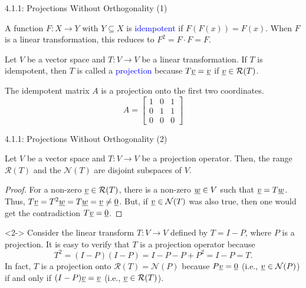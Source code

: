 \documentclass[10pt,letterpaper,english]{beamer}
\begin{document}
\begin{frame}{4.1.1: Projections Without Orthogonality (1)}

\begin{definition}
A function $F \colon X \rightarrow Y$ with $Y \subseteq X$ is \textcolor{blue}{idempotent} if $F(F(x))=F(x)$.  When $F$ is a linear transformation, this reduces to $F^2 = F \cdot F = F$.
\end{definition}

\begin{definition}
Let $V$ be a vector space and $T \colon V \rightarrow V$ be a linear transformation.
If $T$ is idempotent, then $T$ is called a \textcolor{blue}{projection} because $T\underline{v} = \underline{v}$ if $\underline{v} \in \mathcal{R}(T)$.
\end{definition}

\begin{example}
The idempotent matrix $A$ is a projection onto the first two coordinates. \vspace{-2mm}
\begin{equation*}
A = \begin{bmatrix}
1 & 0 & 1 \\
0 & 1 & 1 \\
0 & 0 & 0
\end{bmatrix}
\end{equation*}
\end{example}

\end{frame}

\begin{frame}{4.1.1: Projections Without Orthogonality (2)}

\begin{theorem}
Let $V$ be a vector space and $T \colon V \rightarrow V$ be a projection operator.
Then, the range $\mathcal{R}(T)$ and the $\mathcal{N}(T)$ are disjoint subspaces of $V$.
\end{theorem}

\begin{proof}
For a non-zero $\underline{v} \in \mathcal{R}(T)$, there is a non-zero $\underline{w} \in V$ such that $\underline{v} = T\underline{w}$.  Thus, $T\underline{v} = T^2  \underline{w} = T \underline{w} = \underline{v} \neq \underline{0}$.  But, if $\underline{v} \in \mathcal{N}(T)$ was also true, then one would get the contradiction $T\underline{v} = \underline{0}$.
\end{proof}

\begin{example}<2->
Consider the linear transform $T \colon V \rightarrow V$ defined by $T = I - P$, where $P$ is a projection.
It is easy to verify that $T$ is a projection operator because \vspace{-2mm}
\[ T^2 = (I-P)(I-P) = I - P- P + P^2 = I-P = T .\]
In fact, $T$ is a projection onto $\mathcal{R}(T) = \mathcal{N}(P)$ because $P \underline{v} = \underline{0}$ (i.e., $\underline{v} \in \mathcal{N}(P)$) if and only if  $(I-P)\underline{v} = \underline{v}$ (i.e., $\underline{v} \in \mathcal{R}(T)$).
\end{example}

\end{frame}
\end{document}
